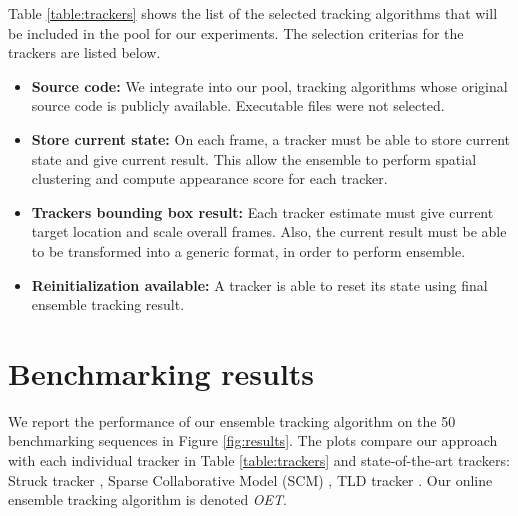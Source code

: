 Table \ref{table:trackers} shows the list of the
selected tracking algorithms that will be included in the pool for our
experiments. The selection criterias for the trackers are
listed below.
\begin{itemize}
\item \textbf{Source code: } We integrate into our pool, tracking algorithms
whose original source code is publicly available. Executable files were not
selected.
\item \textbf{Store current state: } On each frame, a tracker must be able to
store current state and give current result. This allow the ensemble to
perform spatial clustering and compute appearance score for each tracker.
\item \textbf{Trackers bounding box result: } Each tracker estimate must give
current target location and scale overall frames. Also, the current result
must be able to be transformed into a generic format, in order to perform ensemble.
\item \textbf{Reinitialization available: } A tracker is able to reset its
state using final ensemble tracking result.
\end{itemize}

\section{Benchmarking results}

We report the performance of our ensemble tracking algorithm on the 50
benchmarking sequences in
Figure \ref{fig:results}.
The plots compare our approach with each individual tracker
in Table \ref{table:trackers} and state-of-the-art trackers: Struck tracker
\cite{Hare2011}, Sparse Collaborative Model (SCM) \cite{Zhong2012}, TLD tracker
\cite{Kalal2011}. Our online ensemble tracking algorithm is denoted \textit{OET}.

